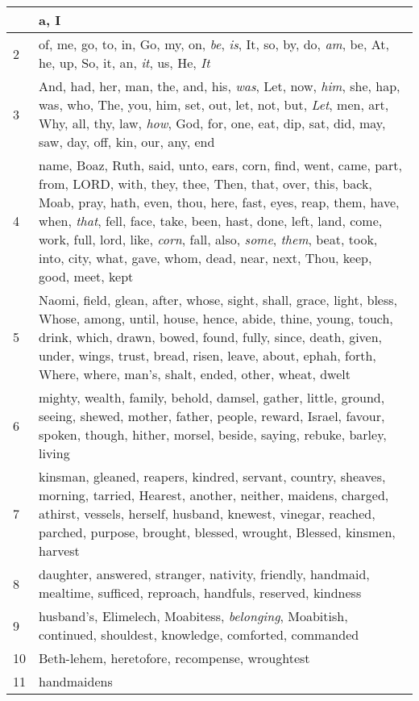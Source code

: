 \begin{longtable}{l|p{3.75in}}
\hline \hline
\endlastfoot
1 & a, I \\ \hline
2 & of, me, go, to, in, Go, my, on, \emph{be}, \emph{is}, It, so, by, do, \emph{am}, be, At, he, up, So, it, an, \emph{it}, us, He, \emph{It} \\ \hline
3 & And, had, her, man, the, and, his, \emph{was}, Let, now, \emph{him}, she, hap, was, who, The, you, him, set, out, let, not, but, \emph{Let}, men, art, Why, all, thy, law, \emph{how}, God, for, one, eat, dip, sat, did, may, saw, day, off, kin, our, any, end \\ \hline
4 & name, Boaz, Ruth, said, unto, ears, corn, find, went, came, part, from, LORD, with, they, thee, Then, that, over, this, back, Moab, pray, hath, even, thou, here, fast, eyes, reap, them, have, when, \emph{that}, fell, face, take, been, hast, done, left, land, come, work, full, lord, like, \emph{corn}, fall, also, \emph{some}, \emph{them}, beat, took, into, city, what, gave, whom, dead, near, next, Thou, keep, good, meet, kept \\ \hline
5 & Naomi, field, glean, after, whose, sight, shall, grace, light, bless, Whose, among, until, house, hence, abide, thine, young, touch, drink, which, drawn, bowed, found, fully, since, death, given, under, wings, trust, bread, risen, leave, about, ephah, forth, Where, where, man's, shalt, ended, other, wheat, dwelt \\ \hline
6 & mighty, wealth, family, behold, damsel, gather, little, ground, seeing, shewed, mother, father, people, reward, Israel, favour, spoken, though, hither, morsel, beside, saying, rebuke, barley, living \\ \hline
7 & kinsman, gleaned, reapers, kindred, servant, country, sheaves, morning, tarried, Hearest, another, neither, maidens, charged, athirst, vessels, herself, husband, knewest, vinegar, reached, parched, purpose, brought, blessed, wrought, Blessed, kinsmen, harvest \\ \hline
8 & daughter, answered, stranger, nativity, friendly, handmaid, mealtime, sufficed, reproach, handfuls, reserved, kindness \\ \hline
9 & husband's, Elimelech, Moabitess, \emph{belonging}, Moabitish, continued, shouldest, knowledge, comforted, commanded \\ \hline
10 & Beth-lehem, heretofore, recompense, wroughtest \\ \hline
11 & handmaidens \\ \hline
\end{longtable}






